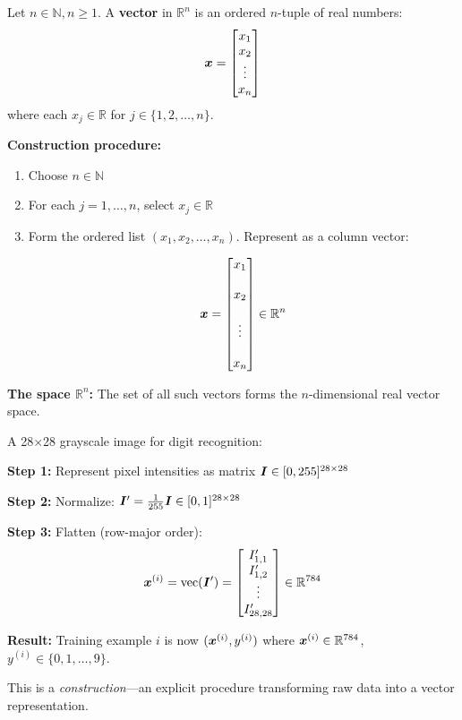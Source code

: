\begin{definition}\label{def:vector}
    Let $n \in \mathbb{N}, n \geq 1$. A \textbf{vector} in $\mathbb{R}^n$ is an ordered $n$-tuple of real numbers:
    \[
        \bm{x} = \begin{bmatrix} x_1 \\ x_2 \\ \vdots \\ x_n \end{bmatrix}
    \]
    where each $x_j \in \mathbb{R}$ for $j \in \{1, 2, \ldots, n\}$.

    \textbf{Construction procedure:}
    \begin{enumerate}
        \item Choose $n \in \mathbb{N}$
        \item For each $j = 1, \ldots, n$, select $x_j \in \mathbb{R}$
        \item Form the ordered list $(x_1, x_2, \ldots, x_n)$. Represent as a column vector:

            \[
                \bm{x} = \begin{bmatrix} x_1 \\\\ x_2 \\\\ \vdots \\\\ x_n \end{bmatrix} \in \mathbb{R}^n
            \]
    \end{enumerate}

    \textbf{The space $\mathbb{R}^n$:} The set of all such vectors forms the $n$-dimensional real vector space.
\end{definition}

\begin{example}
    A 28×28 grayscale image for digit recognition:

    \textbf{Step 1:} Represent pixel intensities as matrix $\bm{I} \in [0,255]^{28 \times 28}$

    \textbf{Step 2:} Normalize: $\bm{I}' = \frac{1}{255}\bm{I} \in [0,1]^{28 \times 28}$

    \textbf{Step 3:} Flatten (row-major order):
    \[
        \bm{x}^{(i)} = \text{vec}(\bm{I}') = \begin{bmatrix} I'_{1,1} \\ I'_{1,2} \\ \vdots \\ I'_{28,28} \end{bmatrix} \in \mathbb{R}^{784}
    \]

    \textbf{Result:} Training example $i$ is now $(\bm{x}^{(i)}, y^{(i)})$ where $\bm{x}^{(i)} \in \mathbb{R}^{784}$, $y^{(i)} \in \{0,1,\ldots,9\}$.

    This is a \textit{construction}—an explicit procedure transforming raw data
    into a vector representation.
\end{example}

